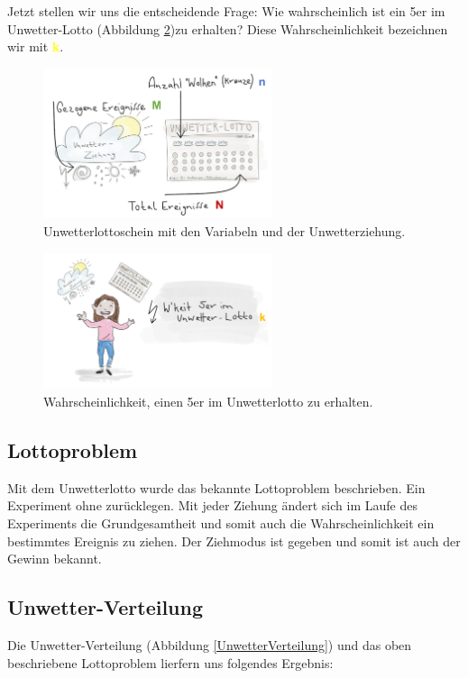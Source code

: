 \begin{refsection}
Jetzt stellen wir uns die entscheidende Frage: Wie wahrscheinlich ist ein 5er im Unwetter-Lotto (Abbildung \ref{WahrscheinlichkeitUnwetterlotto})zu erhalten? Diese Wahrscheinlichkeit bezeichnen wir mit \textcolor{yellow}{\textbf{k}}.

\begin{figure}[htbp]
\centering
\includegraphics[width=0.6\textwidth]{extrem/Lottoscheinausgefuellt.pdf}
\caption{Unwetterlottoschein mit den Variabeln und der Unwetterziehung.}
\label{Lottoscheinausgefuellt}
\end{figure}

\begin{figure}[htbp]
\centering
\includegraphics[width=0.6\textwidth]{extrem/wkeitlotto.pdf}
\caption{Wahrscheinlichkeit, einen 5er im Unwetterlotto zu erhalten.}
\label{WahrscheinlichkeitUnwetterlotto}
\end{figure}

\subsection{Lottoproblem}
Mit dem Unwetterlotto wurde das bekannte Lottoproblem beschrieben. Ein Experiment ohne zurücklegen. Mit jeder Ziehung ändert sich im Laufe des Experiments die Grundgesamtheit und somit auch die Wahrscheinlichkeit ein bestimmtes Ereignis zu ziehen. Der Ziehmodus ist gegeben und somit ist auch der Gewinn bekannt.


\subsection{Unwetter-Verteilung}
Die Unwetter-Verteilung (Abbildung \ref{UnwetterVerteilung}) und das oben beschriebene Lottoproblem lierfern uns folgendes Ergebnis:



\end{refsection}
